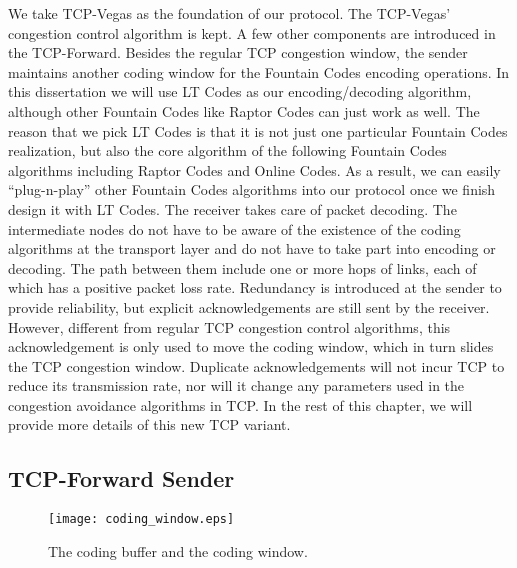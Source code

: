 \documentclass[10pt, conference, final, letterpaper]{IEEEtran}
\theoremstyle{definition}
\begin{document}
We take TCP-Vegas as the foundation of our protocol. The TCP-Vegas' congestion control algorithm is kept. A few other components are introduced in the TCP-Forward. Besides the regular TCP congestion window, the sender maintains another coding window for the Fountain Codes encoding operations. In this dissertation we will use LT Codes as our encoding/decoding algorithm, although other Fountain Codes like Raptor Codes can just work as well. The reason that we pick LT Codes is that it is not just one particular Fountain Codes realization, but also the core algorithm of the following Fountain Codes algorithms including Raptor Codes and Online Codes. As a result, we can easily ``plug-n-play'' other Fountain Codes algorithms into our protocol once we finish design it with LT Codes. The receiver takes care of packet decoding. The intermediate nodes do not have to be aware of the existence of the coding algorithms at the transport layer and do not have to take part into encoding or decoding. The path between them include one or more hops of links, each of which has a positive packet loss rate. Redundancy is introduced at the sender to provide reliability, but explicit acknowledgements are still sent by the receiver. However, different from regular TCP congestion control algorithms, this acknowledgement is only used to move the coding window, which in turn slides the TCP congestion window. Duplicate acknowledgements will not incur TCP to reduce its transmission rate, nor will it change any parameters used in the congestion avoidance algorithms in TCP. In the rest of this chapter, we will provide more details of this new TCP variant. 

\subsection{TCP-Forward Sender}
\label{section:TCP-Forward:sender}

\begin{figure}[htb]
	\begin{center}
		\texttt{[image: coding\_window.eps]}
	\end{center}
	\caption{The coding buffer and the coding window.}
	\label{fig:coding_window}
\end{figure}
\end{document}

